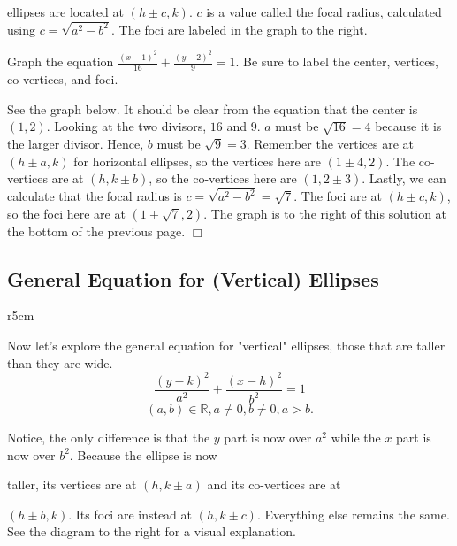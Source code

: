 \documentclass[../book.tex]{subfiles}
\begin{document}
\noindent ellipses are located at $(h \pm c,k)$.  $c$ is a value called the focal radius, calculated using $c=\sqrt{a^2-b^2}$.  The foci are labeled in the graph to the right.

\begin{example}
Graph the equation $\frac{(x-1)^2}{16} + \frac{(y-2)^2}{9} = 1$.  Be sure to label the center, vertices, co-vertices, and foci.
\end{example}
\begin{solution}
See the graph below.
It should be clear from the equation that the center is $(1,2)$.  Looking at the two divisors, $16$ and $9$.  $a$ must be $\sqrt{16}=4$ because it is the larger divisor.  Hence, $b$ must be $\sqrt{9}=3$.  Remember the vertices are at $(h\pm a,k)$ for horizontal ellipses, so the vertices here are $(1 \pm 4,2)$.  The co-vertices are at $(h, k \pm b)$, so the co-vertices here are $(1,2 \pm 3)$.  Lastly, we can calculate that the focal radius is $c=\sqrt{a^2-b^2}=\sqrt{7}$.  The foci are at $(h \pm c ,k)$, so the foci here are at $(1 \pm \sqrt7, 2)$.  The graph is to the right of this solution at the bottom of the previous page. $\Box$
\end{solution}

\subsection{General Equation for (Vertical) Ellipses}

\begin{wrapfigure}{r}{5cm}
\end{wrapfigure}

\noindent Now let's explore the general equation for "vertical" ellipses, those that are taller than they are wide.
$$ \frac{(y-k)^2}{a^2} + \frac{(x-h)^2}{b^2} = 1$$$$(a,b)\in\mathbb{R},a\neq 0,b\neq 0,a>b.$$

\noindent Notice, the only difference is that the $y$ part is now over $a^2$ while the $x$ part is now over $b^2$.  Because the ellipse is now 

\noindent taller, its vertices are at $(h,k \pm a)$ and its co-vertices are at

\noindent $(h \pm b, k)$.  Its foci are instead at $ (h,k \pm c) $.  Everything else remains the same.  See the diagram to the right for a visual explanation.
\end{document}
